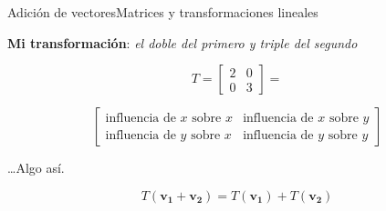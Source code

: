 \documentclass[spanish, c]{beamer}
\begin{document}
\begin{frame}[allowframebreaks]{Adición de vectores}{Matrices y transformaciones lineales}

    \textbf{Mi transformación}: \textit{el doble del primero y triple del segundo}
    
    \bigskip

    $$T = \begin{bmatrix}
        2 & 0 \\
        0 & 3
    \end{bmatrix} = $$
    
    $$
    \begin{bmatrix}
    \text{influencia de } x \text{ sobre } x & \text{influencia de } x \text{ sobre } y \\
    \text{influencia de } y \text{ sobre } x & \text{influencia de } y \text{ sobre } y
    \end{bmatrix}$$

    \bigskip

    \dots Algo así.

    \framebreak

    $$T(\mathbf{v_1} + \mathbf{v_2}) = T(\mathbf{v_1}) + T(\mathbf{v_2})$$

    \bigskip


\end{frame}
\end{document}
